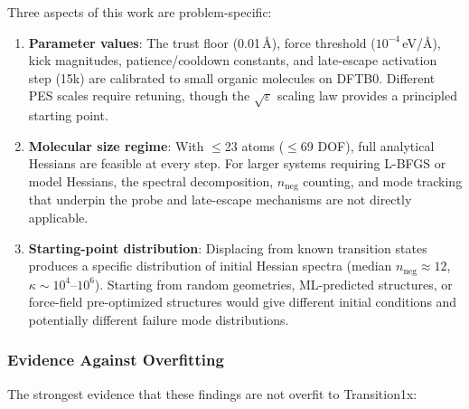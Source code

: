 \documentclass[11pt,a4paper]{article}
\theoremstyle{definition}
\begin{document}
Three aspects of this work are problem-specific:

\begin{enumerate}[nosep]
  \item \textbf{Parameter values}: The trust floor (0.01\,\AA), force
    threshold ($10^{-4}$\,eV/\AA), kick magnitudes, patience/cooldown
    constants, and late-escape activation step (15k) are calibrated to
    small organic molecules on DFTB0.  Different PES scales require
    retuning, though the $\sqrt{\varepsilon}$ scaling law provides a
    principled starting point.
  \item \textbf{Molecular size regime}: With $\leq$23 atoms ($\leq$69
    DOF), full analytical Hessians are feasible at every step.  For
    larger systems requiring L-BFGS or model Hessians, the spectral
    decomposition, $n_\text{neg}$ counting, and mode tracking that
    underpin the probe and late-escape mechanisms are not directly
    applicable.
  \item \textbf{Starting-point distribution}: Displacing from known
    transition states produces a specific distribution of initial
    Hessian spectra (median $n_\text{neg} \approx 12$,
    $\kappa \sim 10^{4}$--$10^{6}$).  Starting from random geometries,
    ML-predicted structures, or force-field pre-optimized structures
    would give different initial conditions and potentially different
    failure mode distributions.
\end{enumerate}

\subsubsection{Evidence Against Overfitting}

The strongest evidence that these findings are not overfit to
Transition1x:
\end{document}
